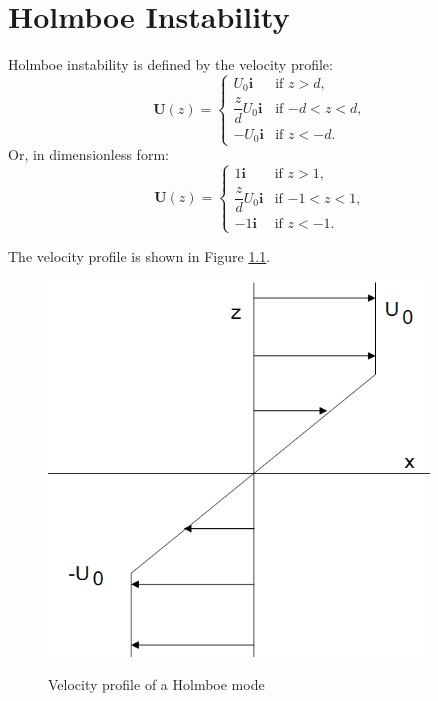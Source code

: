 \chapter{Holmboe Instability}
Holmboe instability is defined by the velocity profile:
\begin{equation}\label{ho:pro}
\mathbf{U}(z) =
\begin{cases}
U_0 \mathbf{i} &\text{if $z>d$,}\\
\dfrac{z}{d}U_0\mathbf{i} &\text{if $-d<z<d$,}\\
-U_0 \mathbf{i} &\text{if $z<-d$.}
\end{cases}
\end{equation}
Or, in dimensionless form:
\begin{equation}\label{ho:pro2}
\mathbf{U}(z) =
\begin{cases}
1 \mathbf{i} &\text{if $z>1$,}\\
\dfrac{z}{d}U_0\mathbf{i} &\text{if $-1<z<1$,}\\
-1 \mathbf{i} &\text{if $z<-1$.}
\end{cases}
\end{equation}

The velocity profile is shown in Figure \ref{hopro}.
\begin{figure}[htpb]
  \centering
  \includegraphics[width=0.9\textwidth]{hopro.png}\\
  \caption{Velocity profile of a Holmboe mode}\label{hopro}
\end{figure}
